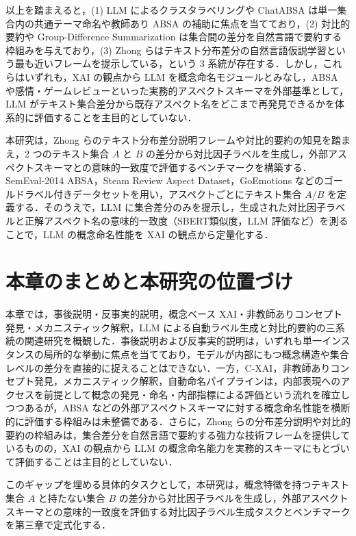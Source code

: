 以上を踏まえると，(1) LLM によるクラスタラベリングや ChatABSA は単一集合内の共通テーマ命名や教師あり ABSA の補助に焦点を当てており，(2) 対比的要約や Group-Difference Summarization は集合間の差分を自然言語で要約する枠組みを与えており，(3) Zhong らはテキスト分布差分の自然言語仮説学習という最も近いフレームを提示している，という 3 系統が存在する．しかし，これらはいずれも，XAI の観点から LLM を概念命名モジュールとみなし，ABSA や感情・ゲームレビューといった実務的アスペクトスキーマを外部基準として，LLM がテキスト集合差分から既存アスペクト名をどこまで再発見できるかを体系的に評価することを主目的としていない．

本研究は，Zhong らのテキスト分布差分説明フレームや対比的要約の知見を踏まえ，2 つのテキスト集合 $A$ と $B$ の差分から対比因子ラベルを生成し，外部アスペクトスキーマとの意味的一致度で評価するベンチマークを構築する．SemEval-2014 ABSA，Steam Review Aspect Dataset，GoEmotions などのゴールドラベル付きデータセットを用い，アスペクトごとにテキスト集合 $A/B$ を定義する．そのうえで，LLM に集合差分のみを提示し，生成された対比因子ラベルと正解アスペクト名の意味的一致度（SBERT類似度，LLM 評価など）を測ることで，LLM の概念命名性能を XAI の観点から定量化する．

\section{本章のまとめと本研究の位置づけ}

本章では，事後説明・反事実的説明，概念ベース XAI・非教師ありコンセプト発見・メカニスティック解釈，LLM による自動ラベル生成と対比的要約の三系統の関連研究を概観した．事後説明および反事実的説明は，いずれも単一インスタンスの局所的な挙動に焦点を当てており，モデルが内部にもつ概念構造や集合レベルの差分を直接的に捉えることはできない．一方，C-XAI，非教師ありコンセプト発見，メカニスティック解釈，自動命名パイプラインは，内部表現へのアクセスを前提として概念の発見・命名・内部指標による評価という流れを確立しつつあるが，ABSA などの外部アスペクトスキーマに対する概念命名性能を横断的に評価する枠組みは未整備である．さらに，Zhong らの分布差分説明や対比的要約の枠組みは，集合差分を自然言語で要約する強力な技術フレームを提供しているものの，XAI の観点から LLM の概念命名能力を実務的スキーマにもとづいて評価することは主目的としていない．

このギャップを埋める具体的タスクとして，本研究は，概念特徴を持つテキスト集合 $A$ と持たない集合 $B$ の差分から対比因子ラベルを生成し，外部アスペクトスキーマとの意味的一致度を評価する対比因子ラベル生成タスクとベンチマークを第三章で定式化する．
